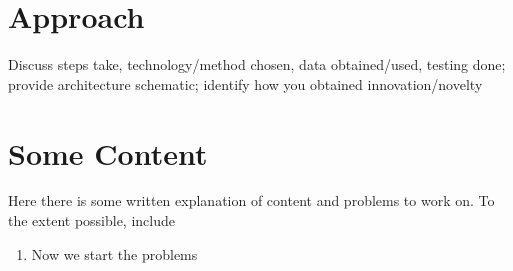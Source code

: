 \documentclass{tufte-handout}
\author{Day X: Catchy Title}
\date{*CLASS DATE*}
\begin{document}
\vspace{0.1in}




\section{Approach} Discuss steps take, technology/method chosen, data obtained/used, testing done; provide architecture schematic; identify how you obtained innovation/novelty







\section{Some Content}

Here there is some written explanation of content and problems to work on. To the extent possible, include

\begin{enumerate}
\item Now we start the problems
\end{enumerate}
\end{document}
